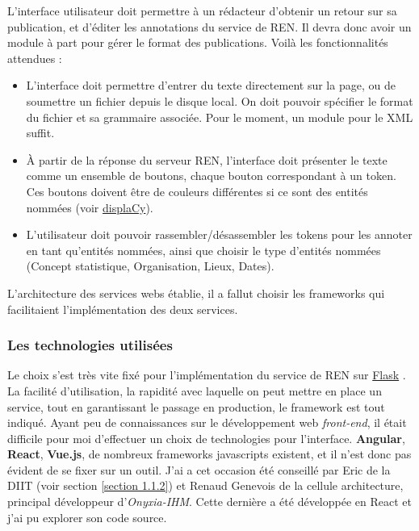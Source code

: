 L'interface utilisateur doit permettre à un rédacteur d'obtenir un retour sur sa publication, et d'éditer les annotations du service de REN. Il devra donc avoir un module à part pour gérer le format des publications. Voilà les fonctionnalités attendues :
\begin{itemize}
    \item L'interface doit permettre d'entrer du texte directement sur la page, ou de soumettre un fichier depuis le disque local. On doit pouvoir spécifier le format du fichier et sa grammaire associée. Pour le moment, un module pour le XML suffit.
    \item À partir de la réponse du serveur REN, l'interface doit présenter le texte comme un ensemble de boutons, chaque bouton correspondant à un token. Ces boutons doivent être de couleurs différentes si ce sont des entités nommées (voir \href{https://spacy.io/usage/visualizers#ent}{displaCy}\cite{displacy}).
    \item L'utilisateur doit pouvoir rassembler/désassembler les tokens pour les annoter en tant qu'entités nommées, ainsi que choisir le type d'entités nommées (Concept statistique, Organisation, Lieux, Dates).
    \newline
\end{itemize}

L'architecture des services webs établie, il a fallut choisir les frameworks qui facilitaient l'implémentation des deux services.

\label{section 3.2.1 - Architecture des services}

\subsubsection{Les technologies utilisées}
Le choix s'est très vite fixé pour l'implémentation du service de REN sur \href{https://github.com/pallets/flask}{Flask} \cite{flask}. La facilité d'utilisation, la rapidité avec laquelle on peut mettre en place un service, tout en garantissant le passage en production, le framework est tout indiqué. Ayant peu de connaissances sur le développement web \textit{front-end}, il était difficile pour moi d'effectuer un choix de technologies pour l'interface. \textbf{Angular}, \textbf{React}, \textbf{Vue.js}, de nombreux frameworks javascripts existent, et il n'est donc pas évident de se fixer sur un outil. J'ai a cet occasion été conseillé par Eric de la DIIT (voir section \ref{section 1.1.2}) et Renaud Genevois de la cellule architecture, principal développeur d'\textit{Onyxia-IHM}. Cette dernière a été développée en React et j'ai pu explorer son code source.
\label{section 3.2.2}

